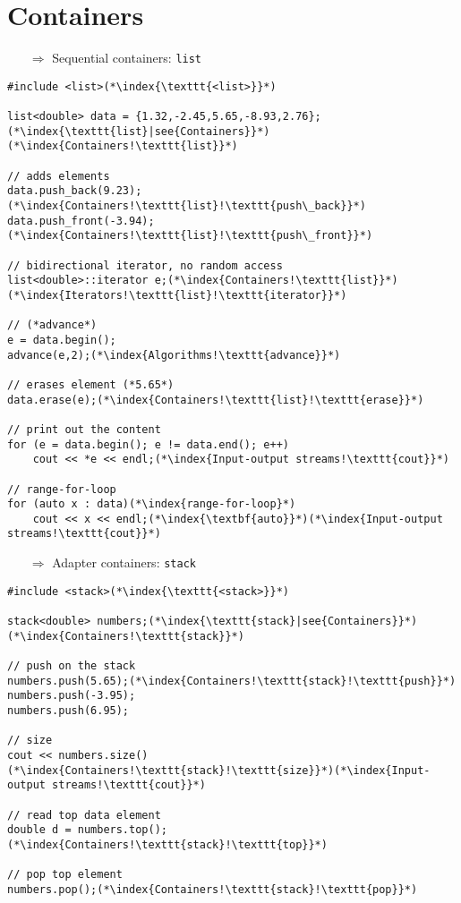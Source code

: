 \documentclass[10pt]{article}
\begin{document}
\section{Containers}
\small
\begin{enumerate}
\item[$\Rightarrow$] Sequential containers: \texttt{list}
\end{enumerate}
\begin{lstlisting}
#include <list>(*\index{\texttt{<list>}}*)

list<double> data = {1.32,-2.45,5.65,-8.93,2.76};(*\index{\texttt{list}|see{Containers}}*)(*\index{Containers!\texttt{list}}*)

// adds elements
data.push_back(9.23);(*\index{Containers!\texttt{list}!\texttt{push\_back}}*)
data.push_front(-3.94);(*\index{Containers!\texttt{list}!\texttt{push\_front}}*)

// bidirectional iterator, no random access    
list<double>::iterator e;(*\index{Containers!\texttt{list}}*)(*\index{Iterators!\texttt{list}!\texttt{iterator}}*)

// (*advance*)
e = data.begin();
advance(e,2);(*\index{Algorithms!\texttt{advance}}*)

// erases element (*5.65*)
data.erase(e);(*\index{Containers!\texttt{list}!\texttt{erase}}*)

// print out the content    
for (e = data.begin(); e != data.end(); e++)
    cout << *e << endl;(*\index{Input-output streams!\texttt{cout}}*)
    
// range-for-loop
for (auto x : data)(*\index{range-for-loop}*)
    cout << x << endl;(*\index{\textbf{auto}}*)(*\index{Input-output streams!\texttt{cout}}*)
\end{lstlisting}
\begin{enumerate}
\item[$\Rightarrow$] Adapter containers: \texttt{stack}
\end{enumerate}
\begin{lstlisting}
#include <stack>(*\index{\texttt{<stack>}}*)

stack<double> numbers;(*\index{\texttt{stack}|see{Containers}}*)(*\index{Containers!\texttt{stack}}*)

// push on the stack
numbers.push(5.65);(*\index{Containers!\texttt{stack}!\texttt{push}}*)
numbers.push(-3.95);
numbers.push(6.95);

// size
cout << numbers.size()(*\index{Containers!\texttt{stack}!\texttt{size}}*)(*\index{Input-output streams!\texttt{cout}}*)

// read top data element
double d = numbers.top();(*\index{Containers!\texttt{stack}!\texttt{top}}*)

// pop top element
numbers.pop();(*\index{Containers!\texttt{stack}!\texttt{pop}}*)
\end{lstlisting}
\end{document}
